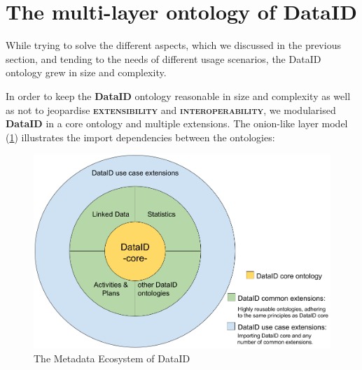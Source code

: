 \documentclass[a4paper,english,twoside,BCOR1.5cm,headsepline,DIV12,appendixprefix,final,12pt]{scrbook}
\newcommand{\extensibility}{{\ttfamily\scshape\bfseries extensibility}\xspace}
\newcommand{\interoperability}{{\ttfamily\scshape\bfseries interoperability}\xspace}
\newcommand{\dataid}{{\ttfamily\bfseries DataID}\xspace}
\begin{document}


\section{The multi-layer ontology of DataID} %
\label{sec:multilayer}

While trying to solve the different aspects, which we discussed in the previous section, and tending to the needs of different usage scenarios, the DataID ontology grew in size and complexity.

In order to keep the \dataid ontology reasonable in size and complexity as well as not to jeopardise \extensibility and \interoperability, we modularised \dataid in a core ontology and multiple extensions. The onion-like layer model (\cref{fig:onion}) illustrates the import dependencies between the ontologies: 

\begin{figure}[!htbp]
\centering
  \includegraphics[width=\textwidth]{images/DataIDonion.png}
  \caption{The Metadata Ecosystem of DataID}
  \label{fig:onion}
\end{figure}
\end{document}
